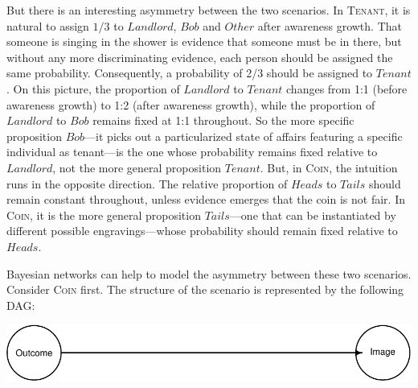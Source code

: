 \documentclass[
  11pt,
  dvipsnames,enabledeprecatedfontcommands]{scrartcl}
\begin{document}
But there is an interesting asymmetry between the two scenarios. In
\textsc{Tenant}, it is natural to assign \(1/3\) to \(Landlord\),
\(Bob\) and \(Other\) after awareness growth. That someone is singing in
the shower is evidence that someone must be in there, but without any
more discriminating evidence, each person should be assigned the same
probability. Consequently, a probability of 2/3 should be assigned to
\(Tenant\). On this picture, the proportion of \(Landlord\) to
\(Tenant\) changes from 1:1 (before awareness growth) to 1:2 (after
awareness growth), while the proportion of \(Landlord\) to \(Bob\)
remains fixed at 1:1 throughout. So the more specific proposition
\(Bob\)---it picks out a particularized state of affairs featuring a
specific individual as tenant---is the one whose probability remains
fixed relative to \(Landlord\), not the more general proposition
\(Tenant\). But, in \textsc{Coin}, the intuition runs in the opposite
direction. The relative proportion of \(Heads\) to \(Tails\) should
remain constant throughout, unless evidence emerges that the coin is not
fair. In \textsc{Coin}, it is the more general proposition
\(Tails\)---one that can be instantiated by different possible
engravings---whose probability should remain fixed relative to
\(Heads\).

Bayesian networks can help to model the asymmetry between these two
scenarios. Consider \textsc{Coin} first. The structure of the scenario
is represented by the following DAG:

\begin{center}\includegraphics[width=0.5\linewidth,height=0.3\textheight]{ReplyToSteeleStefansson2_files/figure-latex/tailsDAG-1} \end{center}
\end{document}

